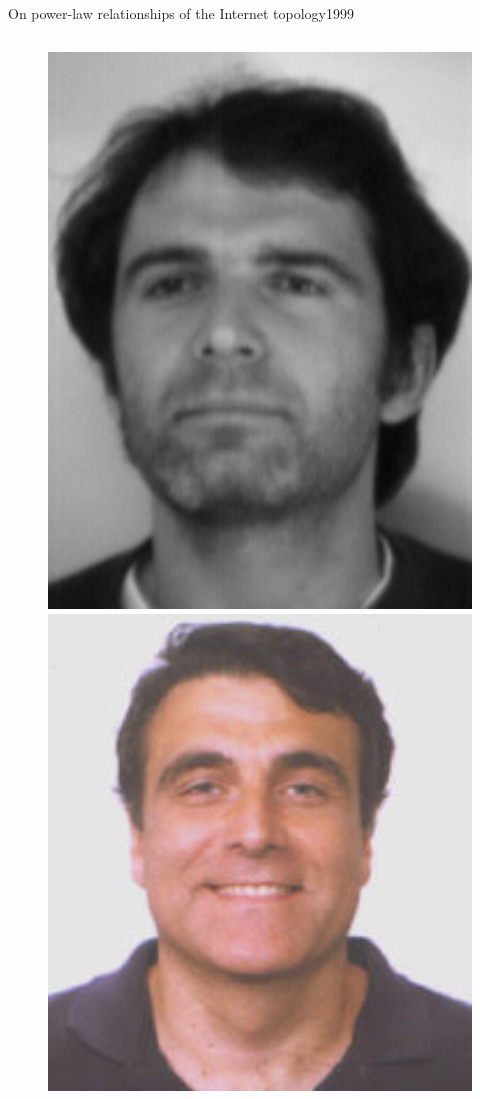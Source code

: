 \documentclass[ngerman,compress,hyperref={bookmarks}]{beamer}
\begin{document}
\begin{frame}{On power-law relationships of the Internet topology}{1999}
\begin{columns}[c]
\begin{column}{0.1\textwidth}
\begin{figure}
        \includegraphics[width=1\textwidth]{images/faloutsos_p}\\
        \includegraphics[width=1\textwidth]{images/faloutsos_c}

\end{figure}
\end{column}
\end{columns}
\end{frame}
\end{document}
